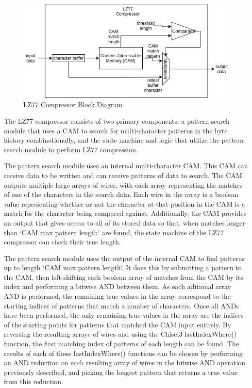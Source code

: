 \documentclass[doublespace,nopageskip]{VTthesis}
\begin{document}
\begin{figure}[htb]
	\centering
	\includegraphics[scale=0.8]{LZ77 Compressor.png}
	\caption{LZ77 Compressor Block Diagram}
	\label{fig:lz77_compressor_block_diagram}
\end{figure}

The LZ77 compressor consists of two primary components: a pattern search module that uses a CAM to search for multi-character patterns in the byte history combinationally, and the state machine and logic that utilize the pattern search module to perform LZ77 compression.

The pattern search module uses an internal multi-character CAM. This CAM can receive data to be written and can receive patterns of data to search. The CAM outputs multiple large arrays of wires, with each array representing the matches of one of the characters in the search data. Each wire in the array is a boolean value representing whether or not the character at that position in the CAM is a match for the character being compared against. Additionally, the CAM provides an output that gives access to all of its stored data so that, when matches longer than `CAM max pattern length` are found, the state machine of the LZ77 compressor can check their true length.

The pattern search module uses the output of the internal CAM to find patterns up to length `CAM max pattern length`. It does this by submitting a pattern to the CAM, then left-shifting each boolean array of matches from the CAM by its index and performing a bitwise AND between them. As each aditional array AND is performed, the remaining true values in the array correspond to the starting indices of patterns that match a number of characters. Once all ANDs have been performed, the only remaining true values in the array are the indices of the starting points for patterns that matched the CAM input entirely. By reversing the resulting arrays of wires and using the Chisel3 lastIndexWhere() function, the first matching index of patterns of each length can be found. The results of each of these lastIndexWhere() functions can be chosen by performing an AND reduction on each resulting array of wires in the bitwise AND operation previously described, and picking the longest pattern that returns a true value from this reduction.
\end{document}
